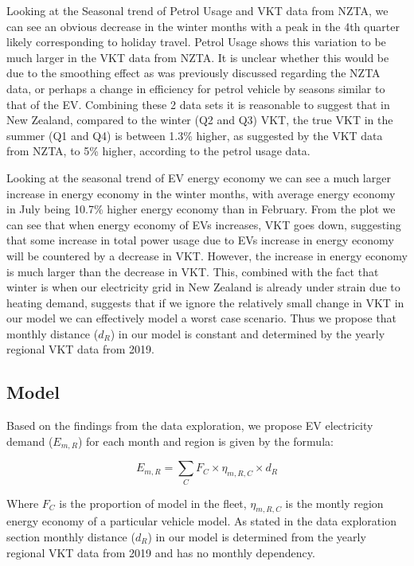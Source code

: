 \documentclass[
]{article}
\begin{document}
Looking at the Seasonal trend of Petrol Usage and VKT data from NZTA, we
can see an obvious decrease in the winter months with a peak in the 4th
quarter likely corresponding to holiday travel. Petrol Usage shows this
variation to be much larger in the VKT data from NZTA. It is unclear
whether this would be due to the smoothing effect as was previously
discussed regarding the NZTA data, or perhaps a change in efficiency for
petrol vehicle by seasons similar to that of the EV. Combining these 2
data sets it is reasonable to suggest that in New Zealand, compared to
the winter (Q2 and Q3) VKT, the true VKT in the summer (Q1 and Q4) is
between 1.3\% higher, as suggested by the VKT data from NZTA, to 5\%
higher, according to the petrol usage data.

Looking at the seasonal trend of EV energy economy we can see a much
larger increase in energy economy in the winter months, with average
energy economy in July being 10.7\% higher energy economy than in
February. From the plot we can see that when energy economy of EVs
increases, VKT goes down, suggesting that some increase in total power
usage due to EVs increase in energy economy will be countered by a
decrease in VKT. However, the increase in energy economy is much larger
than the decrease in VKT. This, combined with the fact that winter is
when our electricity grid in New Zealand is already under strain due to
heating demand, suggests that if we ignore the relatively small change
in VKT in our model we can effectively model a worst case scenario. Thus
we propose that monthly distance (\(d_{R}\)) in our model is constant
and determined by the yearly regional VKT data from 2019.

\hypertarget{model}{%
\subsection{Model}\label{model}}

Based on the findings from the data exploration, we propose EV
electricity demand (\(E_{m,R}\)) for each month and region is given by
the formula:

\begin{equation}
\label{eq:energy_usage}
E_{m,R} = \sum_{C} F_C \times \eta_{m,R,C} \times d_{R}
\end{equation}

Where \(F_C\) is the proportion of model in the fleet, \(\eta_{m,R,C}\)
is the montly region energy economy of a particular vehicle model. As
stated in the data exploration section monthly distance (\(d_{R}\)) in
our model is determined from the yearly regional VKT data from 2019 and
has no monthly dependency.
\end{document}
